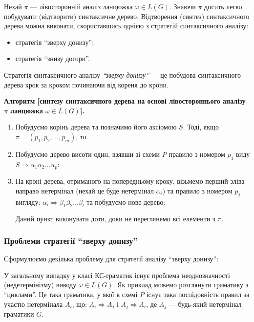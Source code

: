 Нехай $\pi$ --- лівосторонній аналіз ланцюжка $\omega \in L(G)$. Знаючи $\pi$ досить легко побудувати (відтворити) синтаксичне дерево. Відтворення (синтез) синтаксичного дерева можна виконати, скориставшись однією з стратегій синтаксичного аналізу:
\begin{itemize}
	\item стратегія ``зверху донизу'';
	\item стратегія ``знизу догори''.
\end{itemize}

Стратегія синтаксичного аналізу \textit{``зверху донизу''} --- це побудова синтаксичного дерева крок за кроком починаючи від кореня до крони. \medskip

\textbf{Алгоритм [синтезу синтаксичного дерева на основі лівостороннього аналізу $\pi$ ланцюжка $\omega \in L(G)$].}
\begin{enumerate}
	\item Побудуємо корінь дерева та позначимо його аксіомою $S$. Тоді, якщо $\pi = (p_1, p_2, \ldots, p_m)$, то

	\item Побудуємо дерево висоти один, взявши зі схеми $P$ правило з номером $p_1$ виду $S \Rightarrow \alpha_1 \alpha_2 \ldots \alpha_p$:
	\begin{figure}[H]
		\centering
		
	\end{figure}

	\item На кроні дерева, отриманого на попередньому кроку, візьмемо перший зліва направо нетермінал (нехай це буде нетермінал $\alpha_i$) та правило з номером $p_j$ вигляду: $\alpha_i \Rightarrow \beta_1 \beta_2 \ldots \beta_l$ та побудуємо нове дерево:
	\begin{figure}[H]
		\centering
		
	\end{figure}

	Даний пункт виконувати доти, доки не переглянемо всі елементи з $\pi$.
\end{enumerate}

\subsubsection{Проблеми стратегії ``зверху донизу''}

Сформулюємо декілька проблему для стратегії аналізу ``зверху донизу'': \medskip

У загальному випадку у класі КС-граматик існує проблема неоднозначності (недетермінізму) виводу $\omega \in L(G)$. Як приклад можемо розглянути граматику з ``циклами''. Це така граматика, у якої в схемі $P$ існує така послідовність правил за участю нетермінала $A_i$, що: $A_i \Rightarrow A_j$ і $A_j \Rightarrow A_i$, де $A_j$ --- будь-який нетермінал граматики $G$. \medskip

